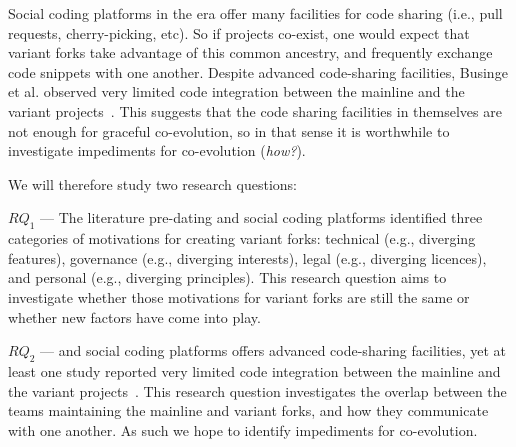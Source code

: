 Social coding platforms in the \gh era offer many facilities for code sharing (i.e., pull requests, cherry-picking, etc).
So if projects co-exist, one would expect that variant forks take advantage of this common ancestry, and frequently exchange code snippets with one another.
Despite advanced code-sharing facilities, Businge et al. observed very limited code integration between the mainline and the variant projects~\cite{businge:emse:2021}.
This suggests that the code sharing facilities in themselves are not enough for graceful co-evolution, so in that sense it is worthwhile to investigate impediments for co-evolution (\textit{how?}).


\noindent
We will therefore study two research questions:

 $RQ_1$ --- \textit{\RQOne}
The literature pre-dating \git and social coding platforms identified three categories of motivations for creating variant forks: technical (e.g., diverging features), governance (e.g., diverging interests), legal (e.g., diverging licences), and personal (e.g., diverging principles).
This research question aims to investigate whether those motivations for variant forks are still the same or whether new factors have come into play. 

$RQ_2$ --- \textit{\RQTwo}
\git and social coding platforms offers advanced code-sharing facilities, yet at least one study reported very limited code integration between the mainline and the variant projects~\cite{businge:emse:2021}.
This research question investigates the overlap between the teams maintaining the mainline and variant forks, and how they communicate with one another.
As such we hope to identify impediments for co-evolution.



